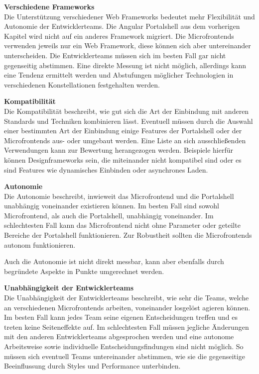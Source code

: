 \textbf{Verschiedene Frameworks}\\
Die Unterstützung verschiedener Web Frameworks bedeutet mehr Flexibilität und Autonomie der Entwicklerteams. Die Angular Portalshell aus dem vorherigen Kapitel wird nicht auf ein anderes Framework migriert.\newline
Die Microfrontends verwenden jeweils nur ein Web Framework, diese können sich aber untereinander unterscheiden. Die Entwicklerteams müssen sich im besten Fall gar nicht gegenseitig abstimmen. Eine direkte Messung ist nicht möglich, allerdings kann eine Tendenz ermittelt werden und Abstufungen möglicher Technologien in verschiedenen Konstellationen festgehalten werden.

\textbf{Kompatibilität}\\
Die Kompatibilität beschreibt, wie gut sich die Art der Einbindung mit anderen Standards und Techniken kombinieren lässt. Eventuell müssen durch die Auswahl einer bestimmten Art der Einbindung einige Features der Portalshell oder der Microfrontends aus- oder umgebaut werden. Eine Liste an sich ausschließenden Verwendungen kann zur Bewertung herangezogen werden. Beispiele hierfür können Designframeworks sein, die miteinander nicht kompatibel sind oder es sind Features wie dynamisches Einbinden oder asynchrones Laden. 

\textbf{Autonomie}\\
Die Autonomie beschreibt, inwieweit das Microfrontend und die Portalshell unabhängig voneinander existieren können. Im besten Fall sind sowohl Microfrontend, als auch die Portalshell, unabhängig voneinander. Im schlechtesten Fall kann das Microfrontend nicht ohne Parameter oder geteilte Bereiche der Portalshell funktionieren. Zur Robustheit sollten die Microfrontends autonom funktionieren.

Auch die Autonomie ist nicht direkt messbar, kann aber ebenfalls durch begründete Aspekte in Punkte umgerechnet werden.

\textbf{Unabhängigkeit der Entwicklerteams}\\
Die Unabhängigkeit der Entwicklerteams beschreibt, wie sehr die Teams, welche an verschiedenen Microfrontends arbeiten, voneinander losgelöst agieren können. Im besten Fall kann jedes Team seine eigenen Entscheidungen treffen und es treten keine Seiteneffekte auf.\newline
Im schlechtesten Fall müssen jegliche Änderungen mit den anderen Entwicklerteams abgesprochen werden und eine autonome Arbeitsweise sowie individuelle Entscheidungsfindungen sind nicht möglich. So müssen sich eventuell Teams untereinander abstimmen, wie sie die gegenseitige Beeinflussung durch Styles und Performance unterbinden.

